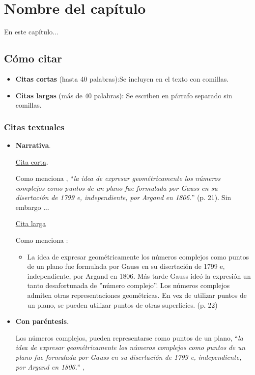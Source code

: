 


\chapter{Nombre del capítulo}
\label{EtiquetaCap4}

 En este capítulo...
\section{Cómo citar}\label{Cap2}
\begin{itemize}
  \item \textbf{Citas cortas} (hasta 40 palabras):Se incluyen en el texto con comillas.
  \item \textbf{Citas largas} (más de 40 palabras): Se escriben en párrafo separado sin comillas.
\end{itemize}
\subsection{Citas textuales}

\begin{itemize}
  \item \textbf{Narrativa}.
  
  \underline{Cita corta}.
   
   Como menciona \cite{apostol1976analisis}, ``\emph{la idea de expresar geométricamente los números complejos como puntos de un plano fue formulada por Gauss en su disertación de 1799 e, independiente, por Argand en 1806.}'' (p. 21). Sin embargo ...
  
  \underline{Cita larga}
  
  Como menciona \cite{apostol1976analisis}:
  \begin{itemize}
    \item [] La idea de expresar geométricamente los números complejos como puntos de un plano fue formulada por Gauss en su disertación de 1799 e, independiente, por Argand en 1806. Más tarde Gauss ideó la expresión un tanto desafortunada de ''número complejo''. Los números complejos admiten otras representaciones geométricas. En vez de utilizar puntos de un plano, se pueden utilizar puntos de otras superficies. (p. 22)
  \end{itemize}

  

  \item \textbf{Con paréntesis}.
  
  Los números complejos, pueden representarse como puntos de un plano, ``\emph{la idea de expresar geométricamente los números complejos como puntos de un plano fue formulada por Gauss en su disertación de 1799 e, independiente, por Argand en 1806.}'' \cite[p. 21]{apostol1976analisis}, 
  
\end{itemize}

